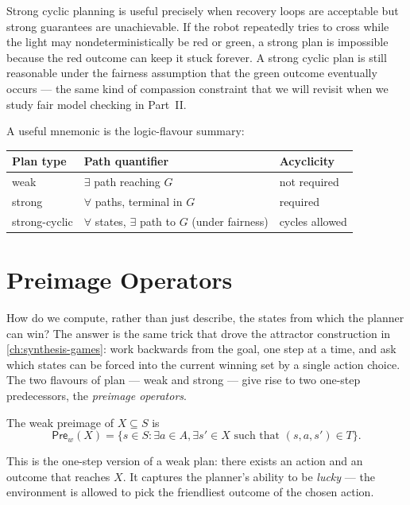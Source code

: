 Strong cyclic planning is useful precisely when recovery loops are
acceptable but strong guarantees are unachievable.  If the robot
repeatedly tries to cross while the light may nondeterministically be
red or green, a strong plan is impossible because the red outcome can
keep it stuck forever.  A strong cyclic plan is still reasonable under
the fairness assumption that the green outcome eventually occurs ---
the same kind of compassion constraint that we will revisit when we
study fair model checking in Part~II.

A useful mnemonic is the logic-flavour summary:

\begin{center}
\begin{tabular}{@{}lll@{}}
\toprule
Plan type & Path quantifier & Acyclicity \\
\midrule
weak        & $\exists$ path reaching $G$      & not required \\
strong      & $\forall$ paths, terminal in $G$ & required \\
strong-cyclic & $\forall$ states, $\exists$ path to $G$ (under fairness) & cycles allowed \\
\bottomrule
\end{tabular}
\end{center}


\section{Preimage Operators}
\label{sec:preimage-operators}

How do we compute, rather than just describe, the states from which the
planner can win?  The answer is the same trick that drove the attractor
construction in \cref{ch:synthesis-games}: work backwards from the goal,
one step at a time, and ask which states can be forced into the current
winning set by a single action choice.  The two flavours of plan ---
weak and strong --- give rise to two one-step predecessors, the
\emph{preimage operators}.

\begin{definition}
\label{def:weak-preimage}
The weak preimage of $X\subseteq S$ is
\[
  \mathsf{Pre}_w(X)=
  \{s\in S:\exists a\in A,\exists s'\in X
        \text{ such that }(s,a,s')\in T\}.
\]
\end{definition}

This is the one-step version of a weak plan: there exists an action and
an outcome that reaches $X$.  It captures the planner's ability to be
\emph{lucky} --- the environment is allowed to pick the friendliest
outcome of the chosen action.

